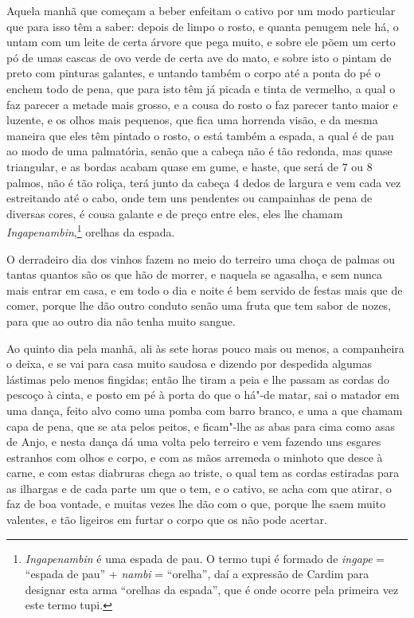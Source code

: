 \begin{linenumbers}
 Aquela manhã que começam a beber enfeitam o cativo por um modo
particular que para isso têm a saber: depois de limpo o rosto, e quanta
penugem nele há, o untam com um leite de certa árvore que pega muito,
e sobre ele põem um certo pó de umas cascas de ovo verde de certa ave
do mato, e sobre isto o pintam de preto com pinturas galantes, e
untando também o corpo até a ponta do pé o enchem todo de pena, que
para isto têm já picada e tinta de vermelho, a qual o faz parecer a
metade mais grosso, e a cousa do rosto o faz parecer tanto maior e
luzente, e os olhos mais pequenos, que fica uma horrenda visão, e da
mesma maneira que eles têm pintado o rosto, o está também a espada, a
qual é de pau ao modo de uma palmatória, senão que a cabeça não é tão
redonda, mas quase triangular, e as bordas acabam quase em gume, e
haste, que será de 7 ou 8 palmos, não é tão roliça, terá junto da
cabeça 4 dedos de largura e vem cada vez estreitando até o cabo, onde
tem uns pendentes ou campainhas de pena de diversas cores, é cousa
galante e de preço entre eles, eles lhe chamam
\textit{Ingapenambin},\footnote{ \textit{Ingapenambin} é uma espada
de pau. O termo tupi é formado de \textit{ingape} = ``espada de pau'' +
\textit{nambi} = ``orelha'', daí a expressão de Cardim para designar esta
arma ``orelhas da espada'', que é onde ocorre pela primeira vez este
termo tupi.} orelhas da espada. 

 O derradeiro dia dos vinhos fazem no meio do terreiro uma choça de
palmas ou tantas quantos são os que hão de morrer, e naquela se
agasalha, e sem nunca mais entrar em casa, e em todo o dia e noite é
bem servido de festas mais que de comer, porque lhe dão outro conduto
senão uma fruta que tem sabor de nozes, para que ao outro dia não tenha
muito sangue.

Ao quinto dia pela manhã, ali às sete horas pouco mais ou
menos, a companheira o deixa, e se vai para casa muito saudosa e
dizendo por despedida algumas lástimas pelo menos fingidas; então lhe
tiram a peia e lhe passam as cordas do pescoço à cinta, e posto em pé à
porta do que o há"-de matar, sai o matador em uma dança, feito alvo como
uma pomba com barro branco, e uma a que chamam capa de pena, que se ata
pelos peitos, e ficam"-lhe as abas para cima como asas de Anjo, e nesta
dança dá uma volta pelo terreiro e vem fazendo uns esgares estranhos
com olhos e corpo, e com as mãos arremeda o minhoto que desce à carne,
e com estas diabruras chega ao triste, o qual tem as cordas estiradas
para as ilhargas e de cada parte um que o tem, e o cativo, se acha com
que atirar, o faz de boa vontade, e muitas vezes lhe dão com o que,
porque lhe saem muito valentes, e tão ligeiros em furtar o corpo que
os não pode acertar.


\end{linenumbers}
